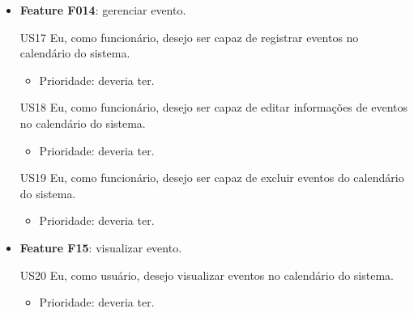 \begin{itemize}
    \item \textbf{Feature F014}: gerenciar evento.

    US17 Eu, como funcionário, desejo ser capaz de registrar eventos no calendário do sistema.

    \begin{itemize}
        \item Prioridade: deveria ter.
    \end{itemize}
    
    US18 Eu, como funcionário, desejo ser capaz de editar informações de eventos no calendário do sistema.

    \begin{itemize}
        \item Prioridade: deveria ter.
    \end{itemize}
    
    US19 Eu, como funcionário, desejo ser capaz de excluir eventos do calendário do sistema.

    \begin{itemize}
        \item Prioridade: deveria ter.
    \end{itemize}
    
    \item \textbf{Feature F15}: visualizar evento.

    US20 Eu, como usuário, desejo visualizar eventos no calendário do sistema.

    \begin{itemize}
        \item Prioridade: deveria ter.
    \end{itemize}

\end{itemize}



